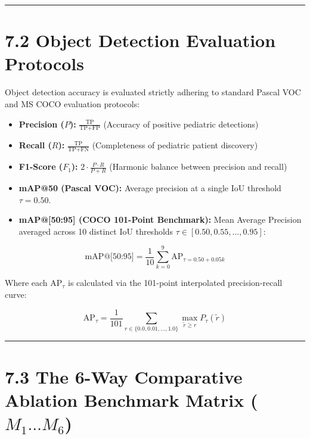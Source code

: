 \begin{center}\rule{0.5\linewidth}{0.5pt}\end{center}

\section{7.2 Object Detection Evaluation
Protocols}\label{object-detection-evaluation-protocols}

Object detection accuracy is evaluated strictly adhering to standard
Pascal VOC and MS COCO evaluation protocols:

\begin{itemize}
\tightlist
\item
  \textbf{Precision (\(P\)):}
  \(\frac{\text{TP}}{\text{TP} + \text{FP}}\) (Accuracy of positive
  pediatric detections)
\item
  \textbf{Recall (\(R\)):} \(\frac{\text{TP}}{\text{TP} + \text{FN}}\)
  (Completeness of pediatric patient discovery)
\item
  \textbf{F1-Score (\(F_1\)):} \(2 \cdot \frac{P \cdot R}{P + R}\)
  (Harmonic balance between precision and recall)
\item
  \textbf{mAP@50 (Pascal VOC):} Average precision at a single IoU
  threshold \(\tau = 0.50\).
\item
  \textbf{mAP@{[}50:95{]} (COCO 101-Point Benchmark):} Mean Average
  Precision averaged across 10 distinct IoU thresholds
  \(\tau \in [0.50, 0.55, \dots, 0.95]\):
\end{itemize}

\[\text{mAP@[50:95]} = \frac{1}{10} \sum_{k=0}^9 \text{AP}_{\tau = 0.50 + 0.05k}\]

Where each \(\text{AP}_{\tau}\) is calculated via the 101-point
interpolated precision-recall curve:

\[\text{AP}_{\tau} = \frac{1}{101} \sum_{r \in \{0.0, 0.01, \dots, 1.0\}} \max_{\tilde{r} \ge r} P_{\tau}(\tilde{r})\]

\begin{center}\rule{0.5\linewidth}{0.5pt}\end{center}

\section{\texorpdfstring{7.3 The 6-Way Comparative Ablation Benchmark
Matrix
(\(M_1 \dots M_6\))}{7.3 The 6-Way Comparative Ablation Benchmark Matrix (M\_1 \textbackslash dots M\_6)}}\label{the-6-way-comparative-ablation-benchmark-matrix-m_1-dots-m_6}

